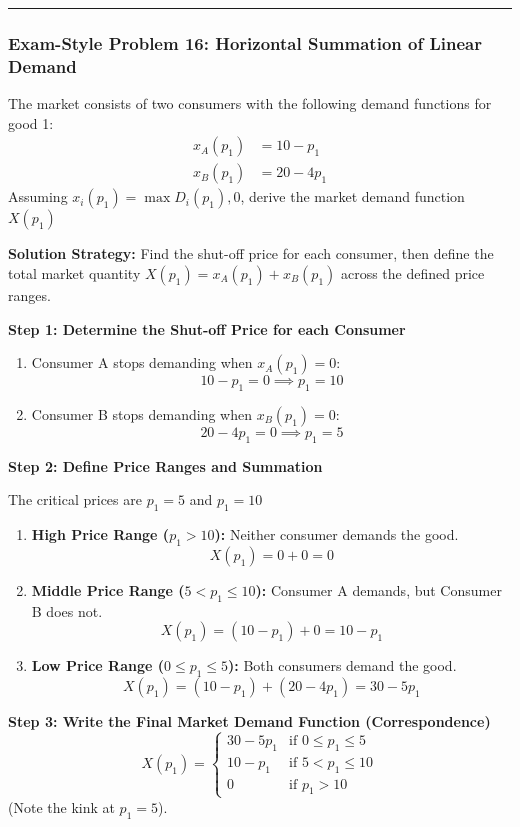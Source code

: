 \documentclass{article}
\begin{document}
\bigskip
\noindent\rule{\linewidth}{0.4pt}
\bigskip

\subsubsection*{Exam-Style Problem 16: Horizontal Summation of Linear Demand}

The market consists of two consumers with the following demand functions for good 1: 
\begin{align*}
x_A(p_1) &= 10 - p_1 \\
x_B(p_1) &= 20 - 4p_1
\end{align*}
Assuming $x_i(p_1) = \max{D_i(p_1), 0}$, derive the market demand function $X(p_1)$

\textbf{Solution Strategy:} Find the shut-off price for each consumer, then define the total market quantity $X(p_1) = x_A(p_1) + x_B(p_1)$ across the defined price ranges.

\textbf{Step 1: Determine the Shut-off Price for each Consumer}
\begin{enumerate}
    \item Consumer A stops demanding when $x_A(p_1) = 0$: 
    \[ 10 - p_1 = 0 \implies p_1 = 10 \]
    \item Consumer B stops demanding when $x_B(p_1) = 0$: 
    \[ 20 - 4p_1 = 0 \implies p_1 = 5 \]
\end{enumerate}

\textbf{Step 2: Define Price Ranges and Summation} 

The critical prices are $p_1=5$ and $p_1=10$
\begin{enumerate}
    \item \textbf{High Price Range ($p_1 > 10$):} Neither consumer demands the good. 
    \[ X(p_1) = 0 + 0 = 0 \]
    \item \textbf{Middle Price Range ($5 < p_1 \leq 10$):} Consumer A demands, but Consumer B does not. 
    \[ X(p_1) = (10 - p_1) + 0 = 10 - p_1 \]
    \item \textbf{Low Price Range ($0 \leq p_1 \leq 5$):} Both consumers demand the good. 
    \[ X(p_1) = (10 - p_1) + (20 - 4p_1) = 30 - 5p_1 \]
\end{enumerate}

\textbf{Step 3: Write the Final Market Demand Function (Correspondence)}
\[ X(p_1) = \begin{cases} 30 - 5p_1 & \text{if } 0 \leq p_1 \leq 5 \\ 10 - p_1 & \text{if } 5 < p_1 \leq 10 \\ 0 & \text{if } p_1 > 10 \end{cases} \]
(Note the kink at $p_1=5$).
\pagebreak
\end{document}
